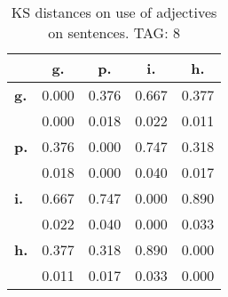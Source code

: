 \begin{table}[h!]
\begin{center}
\begin{tabular}{| l || c | c | c | c |}\hline
 & {\bf g.} & {\bf p.} & {\bf i.} & {\bf h.} \\\hline\hline
{\bf g.} & 0.000 & 0.376 & 0.667 & 0.377 \\
{\bf } & 0.000 & 0.018 & 0.022 & 0.011 \\\hline
{\bf p.} & 0.376 & 0.000 & 0.747 & 0.318 \\
{\bf } & 0.018 & 0.000 & 0.040 & 0.017 \\\hline
{\bf i.} & 0.667 & 0.747 & 0.000 & 0.890 \\
{\bf } & 0.022 & 0.040 & 0.000 & 0.033 \\\hline
{\bf h.} & 0.377 & 0.318 & 0.890 & 0.000 \\
{\bf } & 0.011 & 0.017 & 0.033 & 0.000 \\\hline
\end{tabular}
\caption{KS distances on use of adjectives on sentences. TAG: 8}
\end{center}
\end{table}